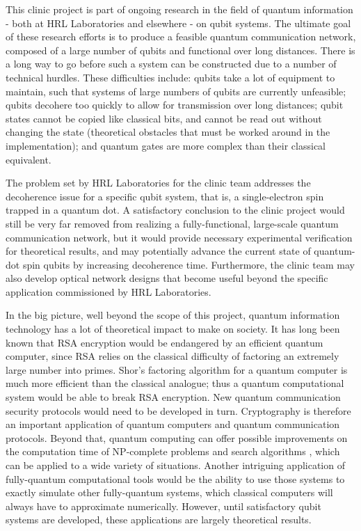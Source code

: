 \documentclass[pdftex,12pt,a4paper]{article}
\begin{document}
This clinic project is part of ongoing research in the field of quantum information - both at HRL Laboratories and elsewhere - on qubit systems. The ultimate goal of these research efforts is to produce a feasible quantum communication network, composed of a large number of qubits and functional over long distances. There is a long way to go before such a system can be constructed due to a number of technical hurdles. These difficulties include: qubits take a lot of equipment to maintain, such that systems of large numbers of qubits are currently unfeasible; qubits decohere too quickly to allow for transmission over long distances; qubit states cannot be copied like classical bits, and cannot be read out without changing the state (theoretical obstacles that must be worked around in the implementation); and quantum gates are more complex than their classical equivalent.

The problem set by HRL Laboratories for the clinic team addresses the decoherence issue for a specific qubit system, that is, a single-electron spin trapped in a quantum dot. A satisfactory conclusion to the clinic project would still be very far removed from realizing a fully-functional, large-scale quantum communication network, but it would provide necessary experimental verification for theoretical results, and may potentially advance the current state of quantum-dot spin qubits by increasing decoherence time. Furthermore, the clinic team may also develop optical network designs that become useful beyond the specific application commissioned by HRL Laboratories.

In the big picture, well beyond the scope of this project, quantum information technology has a lot of theoretical impact to make on society. It has long been known that RSA encryption would be endangered by an efficient quantum computer, since RSA relies on the classical difficulty of factoring an extremely large number into primes. Shor's factoring algorithm for a quantum computer is much more efficient than the classical analogue; thus a quantum computational system would be able to break RSA encryption. New quantum communication security protocols would need to be developed in turn. Cryptography is therefore an important application of quantum computers and quantum communication protocols. Beyond that, quantum computing can offer possible improvements on the computation time of NP-complete problems and search algorithms \cite{nielsen_michael_a._quantum_2000}, which can be applied to a wide variety of situations. Another intriguing application of fully-quantum computational tools would be the ability to use those systems to exactly simulate other fully-quantum systems, which classical computers will always have to approximate numerically. However, until satisfactory qubit systems are developed, these applications are largely theoretical results.
\end{document}

